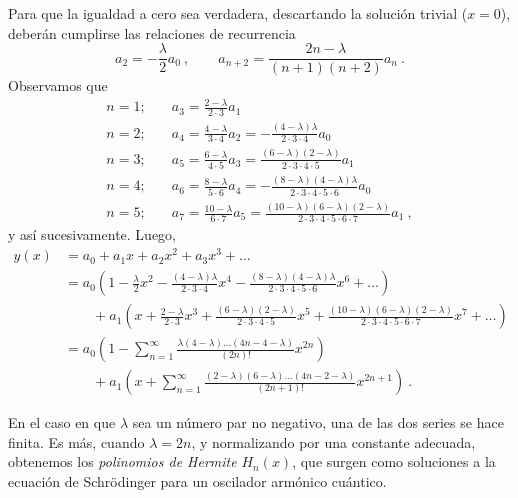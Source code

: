 \begin{ejemplo}
    Para que la igualdad a cero sea verdadera, descartando la solución trivial ($x=0$), deberán cumplirse las relaciones de recurrencia
    \begin{equation}
        a_2 = - \frac{\lambda}{2}a_0 \ , \qquad a_{n+2} = \frac{2n-\lambda}{(n+1)(n+2)}a_n \ .
    \end{equation}
    Observamos que
    \begin{align*}
        n=1; & \quad a_3 = \frac{2-\lambda}{2 \cdot 3} a_1 \\
        n=2; & \quad a_4 = \frac{4-\lambda}{3 \cdot 4} a_2 = - \frac{(4-\lambda) \lambda}{2 \cdot 3 \cdot 4} a_0 \\
        n=3; & \quad a_5 = \frac{6-\lambda}{4 \cdot 5} a_3 = \frac{(6-\lambda)(2-\lambda)}{2 \cdot 3 \cdot 4 \cdot 5} a_1 \\
        n=4; & \quad a_6 = \frac{8-\lambda}{5 \cdot 6}a_4 = - \frac{(8-\lambda)(4-\lambda)\lambda}{2 \cdot 3 \cdot 4 \cdot 5 \cdot 6} a_0 \\
        n=5; & \quad a_7 = \frac{10-\lambda}{6 \cdot 7} a_5 = \frac{(10-\lambda)(6-\lambda)(2-\lambda)}{2 \cdot 3 \cdot 4 \cdot 5 \cdot 6 \cdot 7} a_1 \ ,
    \end{align*}
    y así sucesivamente. Luego, 
    \begin{align}
        y(x) & = a_0 + a_1x + a_2 x^2 + a_3 x^3 + \dots \nonumber \\
        & = a_0 \left( 1 - \frac{\lambda}{2}x^2 - \frac{(4-\lambda)\lambda}{2 \cdot 3 \cdot 4}x^4 - \frac{(8-\lambda)(4-\lambda)\lambda}{2 \cdot 3 \cdot 4 \cdot 5 \cdot 6}x^6 + \dots \right) \nonumber \\
        & \qquad + a_1 \left( x + \frac{2-\lambda}{2 \cdot 3}x^3 + \frac{(6-\lambda)(2-\lambda)}{2 \cdot 3 \cdot 4 \cdot 5} x^5 + \frac{(10-\lambda)(6-\lambda)(2-\lambda)}{2 \cdot 3 \cdot 4 \cdot 5 \cdot 6 \cdot 7}x^7 + \dots \right) \nonumber \\
        & = a_0 \left( 1 - \sum_{n=1}^\infty \frac{\lambda(4-\lambda) \dots (4n - 4 - \lambda)}{(2n)!} x^{2n} \right) \nonumber \\
        & \qquad + a_1 \left( x + \sum_{n=1}^\infty \frac{(2-\lambda)(6-\lambda)\dots (4n-2-\lambda)}{(2n+1)!} x^{2n+1} \right) \ .
    \end{align}

    En el caso en que $\lambda$ sea un número par no negativo, una de las dos series se hace finita. Es más, cuando $\lambda = 2n$, y normalizando por una constante adecuada, obtenemos los \emph{polinomios de Hermite} $H_n(x)$, que surgen como soluciones a la ecuación de Schrödinger para un oscilador armónico cuántico.
\end{ejemplo}

